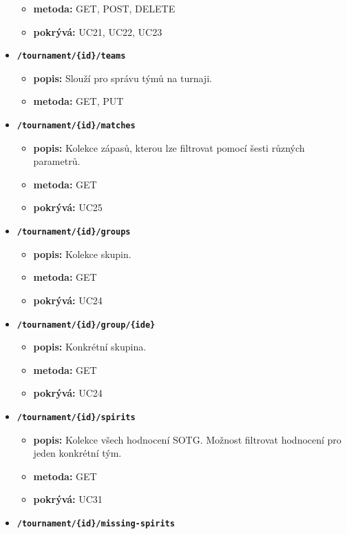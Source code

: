 \begin{itemize}
\begin{itemize}
    \item \textbf{metoda:} GET, POST, DELETE
    \item \textbf{pokrývá:} UC21, UC22, UC23
  \end{itemize}
  \pagebreak
  \item \texttt{\textbf{/tournament/\{id\}/teams}}
  \begin{itemize}
    \item \textbf{popis:} Slouží pro správu týmů na turnaji.
    \item \textbf{metoda:} GET, PUT
  \end{itemize}
  \item \texttt{\textbf{/tournament/\{id\}/matches}}
  \begin{itemize}
    \item \textbf{popis:} Kolekce zápasů, kterou lze filtrovat pomocí šesti různých parametrů.
    \item \textbf{metoda:} GET
    \item \textbf{pokrývá:} UC25\\
  \end{itemize}
  \item \texttt{\textbf{/tournament/\{id\}/groups}}
  \begin{itemize}
    \item \textbf{popis:} Kolekce skupin.
    \item \textbf{metoda:} GET
    \item \textbf{pokrývá:} UC24
  \end{itemize}
  \item \texttt{\textbf{/tournament/\{id\}/group/\{ide\}}}
  \begin{itemize}
    \item \textbf{popis:} Konkrétní skupina.
    \item \textbf{metoda:} GET
    \item \textbf{pokrývá:} UC24
  \end{itemize}
  \item \texttt{\textbf{/tournament/\{id\}/spirits}}
  \begin{itemize}
    \item \textbf{popis:} Kolekce všech hodnocení SOTG. Možnost filtrovat hodnocení pro jeden konkrétní tým.
    \item \textbf{metoda:} GET
    \item \textbf{pokrývá:} UC31
  \end{itemize}
  \item \texttt{\textbf{/tournament/\{id\}/missing-spirits}}

\end{itemize}
